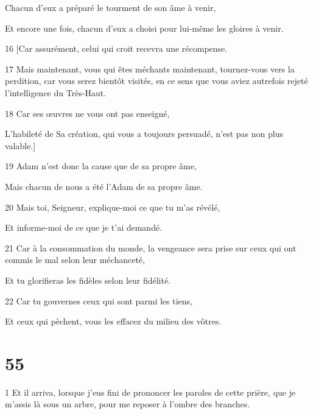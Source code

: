 \par Chacun d'eux a préparé le tourment de son âme à venir,

\par Et encore une fois, chacun d'eux a choisi pour lui-même les gloires à venir.

\par 16 [Car assurément, celui qui croit recevra une récompense.

\par 17 Mais maintenant, vous qui êtes méchants maintenant, tournez-vous vers la perdition, car vous serez bientôt visités, en ce sens que vous aviez autrefois rejeté l'intelligence du Très-Haut.

\par 18 Car ses œuvres ne vous ont pas enseigné,

\par L'habileté de Sa création, qui vous a toujours persuadé, n'est pas non plus valable.]

\par 19 Adam n'est donc la cause que de sa propre âme,

\par Mais chacun de nous a été l'Adam de sa propre âme.

\par 20 Mais toi, Seigneur, explique-moi ce que tu m'as révélé,

\par Et informe-moi de ce que je t'ai demandé.

\par 21 Car à la consommation du monde, la vengeance sera prise sur ceux qui ont commis le mal selon leur méchanceté,

\par Et tu glorifieras les fidèles selon leur fidélité.

\par 22 Car tu gouvernes ceux qui sont parmi les tiens,

\par Et ceux qui pèchent, vous les effacez du milieu des vôtres.

\chapter{55}

\par 1 Et il arriva, lorsque j'eus fini de prononcer les paroles de cette prière, que je m'assis là sous un arbre, pour me reposer à l'ombre des branches.

